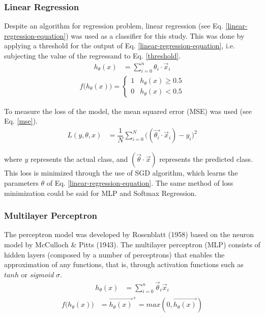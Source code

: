 \subsubsection{Linear Regression}\label{linear-regression}
Despite an algorithm for regression problem, linear regression (see Eq. \ref{linear-regression-equation}) was used as a classifier for this study. This was done by applying a threshold for the output of Eq. \ref{linear-regression-equation}, i.e. subjecting the value of the regressand to Eq. \ref{threshold}.
\begin{align}\label{linear-regression-equation}
h_{\theta}(x)	&= \sum_{i=0}^{n} \theta_{i} \cdot \vec{x}_{i}
\end{align}
\begin{align}\label{threshold}
f\big(h_{\theta}(x)\big)	=	\begin{cases}
									1	&	h_{\theta}(x) \geq 0.5	\\
									0	&	h_{\theta}(x) < 0.5
								\end{cases}
\end{align}

To measure the loss of the model, the mean squared error (MSE) was used (see Eq. \ref{mse}). 
\begin{align}\label{mse}
L(y, \theta, x)	&=	\dfrac{1}{N} \sum_{i = 0}^{N} \big((\vec{\theta_{i}} \cdot \vec{x}_{i}) - y_{i} \big)^{2}
\end{align}

where $y$ represents the actual class, and $(\vec{\theta} \cdot \vec{x})$ represents the predicted class. This loss is minimized through the use of SGD algorithm, which learns the parameters $\theta$ of Eq. \ref{linear-regression-equation}. The same method of loss minimization could be said for MLP and Softmax Regression.

\subsubsection{Multilayer Perceptron}
The perceptron model was developed by Rosenblatt (1958)\cite{rosenblatt1958perceptron} based on the neuron model by McCulloch \& Pitts (1943)\cite{mcculloch1943logical}. The multilayer perceptron (MLP)\cite{bishop1995neural} consists of hidden layers (composed by a number of perceptrons) that enables the approximation of any functions, that is, through activation functions such as $tanh$ or \textit{sigmoid} $\sigma$.
\begin{align}
h_{\theta}(x)	&=	\sum_{i = 0}^{n} \vec{\theta}_{i} \vec{x}_{i}
\end{align}
\begin{align}\label{relu}
f\big(h_{\theta}(x)\big)	&= \vec{h_{\theta}(x)}^{+} = max(0, \vec{h_{\theta}(x)})
\end{align}


